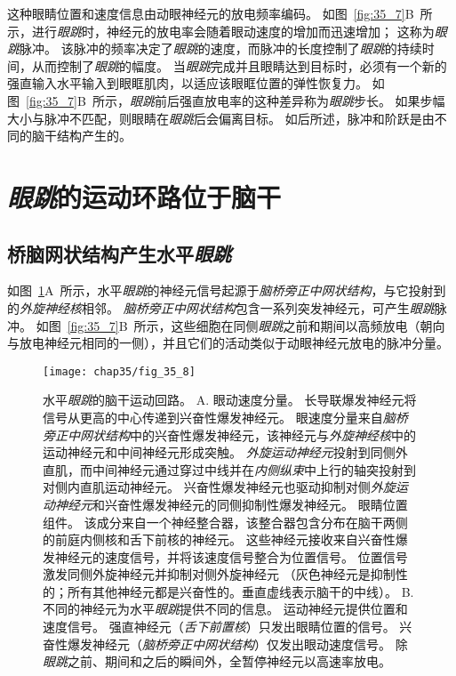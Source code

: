 这种眼睛位置和速度信息由动眼神经元的放电频率编码。
如图~\ref{fig:35_7}B~所示，进行\textit{眼跳}时，神经元的放电率会随着眼动速度的增加而迅速增加；
这称为\textit{眼跳}脉冲。
该脉冲的频率决定了\textit{眼跳}的速度，而脉冲的长度控制了\textit{眼跳}的持续时间，从而控制了\textit{眼跳}的幅度。
当\textit{眼跳}完成并且眼睛达到目标时，必须有一个新的强直输入水平输入到眼眶肌肉，以适应该眼眶位置的弹性恢复力。
如图~\ref{fig:35_7}B~所示，\textit{眼跳}前后强直放电率的这种差异称为\textit{眼跳}步长。
如果步幅大小与脉冲不匹配，则眼睛在\textit{眼跳}后会偏离目标。
如后所述，脉冲和阶跃是由不同的脑干结构产生的。



\section{\textit{眼跳}的运动环路位于脑干}

\subsection{桥脑网状结构产生水平\textit{眼跳}}

如图~\ref{fig:35_8}A~所示，水平\textit{眼跳}的神经元信号起源于\textit{脑桥旁正中网状结构}，与它投射到的\textit{外旋神经核}相邻。
\textit{脑桥旁正中网状结构}包含一系列突发神经元，可产生\textit{眼跳}脉冲。
如图~\ref{fig:35_7}B~所示，这些细胞在同侧\textit{眼跳}之前和期间以高频放电（朝向与放电神经元相同的一侧），并且它们的活动类似于动眼神经元放电的脉冲分量。


\begin{figure}[htbp]
	\centering
	\texttt{[image: chap35/fig\_35\_8]}
	\caption{水平\textit{眼跳}的脑干运动回路。 
		A. 眼动速度分量。
		长导联爆发神经元将信号从更高的中心传递到兴奋性爆发神经元。
		眼速度分量来自\textit{脑桥旁正中网状结构}中的兴奋性爆发神经元，该神经元与\textit{外旋神经核}中的运动神经元和中间神经元形成突触。
		\textit{外旋运动神经元}投射到同侧外直肌，而中间神经元通过穿过中线并在\textit{内侧纵束}中上行的轴突投射到对侧内直肌运动神经元。
		兴奋性爆发神经元也驱动抑制对侧\textit{外旋运动神经元}和兴奋性爆发神经元的同侧抑制性爆发神经元。
		眼睛位置组件。
		该成分来自一个神经整合器，该整合器包含分布在脑干两侧的前庭内侧核和舌下前核的神经元。
		这些神经元接收来自兴奋性爆发神经元的速度信号，并将该速度信号整合为位置信号。
		位置信号激发同侧外旋神经元并抑制对侧外旋神经元
        （灰色神经元是抑制性的；所有其他神经元都是兴奋性的。垂直虚线表示脑干的中线）。
		B. 不同的神经元为水平\textit{眼跳}提供不同的信息。
		运动神经元提供位置和速度信号。
		强直神经元（\textit{舌下前置核}）只发出眼睛位置的信号。
		兴奋性爆发神经元（\textit{脑桥旁正中网状结构}）仅发出眼动速度信号。
		除\textit{眼跳}之前、期间和之后的瞬间外，全暂停神经元以高速率放电。}
	\label{fig:35_8}
\end{figure}


